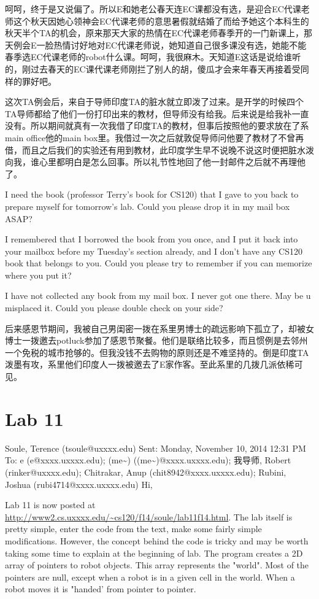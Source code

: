 \documentclass[12pt]{book}
\begin{document}
呵呵，终于是又说偏了。所以E和她老公春天连EC课都没有选，是迎合EC代课老师这个秋天因她心领神会EC代课老师的意思暑假就结婚了而给予她这个本科生的秋天半个TA的机会，原来那天大家的热情在EC代课老师春季开的一门新课上，那天例会E一脸热情讨好地对EC代课老师说，她知道自己很多课没有选，她能不能春季选EC代课老师的robot什么课。呵呵，我很麻木。天知道E这话是说给谁听的，刚过去春天的EC课代课老师刚拦了别人的胡，傻瓜才会来年春天再接着受同样的罪好吧。

这次TA例会后，来自于导师印度TA的脏水就立即泼了过来。是开学的时候四个TA导师都给了他们一份打印出来的教材，但导师没有给我。后来说是给我补一直没有。所以期间就真有一次我借了印度TA的教材，但事后按照他的要求放在了系main office他的main box里。我借过一次之后就敦促导师问他要了教材了不曾再借，而且之后我们的实验还有用到教材，此印度学生早不说晚不说这时便把脏水泼向我，谁心里都明白是怎么回事。所以礼节性地回了他一封邮件之后就不再理他了。

I need the book (professor Terry's book for CS120) that I gave to you back to prepare myself for tomorrow's lab. Could you please drop it in my mail box ASAP?

I remembered that I borrowed the book from you once, and I put it back into your mailbox before my Tuesday's section already, and I don't have any CS120 book that belongs to you. Could you please try to remember if you can memorize where you put it?

I have not collected any book from my mail box. I never got one there. May be u misplaced it. Could you please double check on your side?

后来感恩节期间，我被自己男闺密一拨在系里男博士的疏远影响下孤立了，却被女博士一拨邀去potluck参加了感恩节聚餐。他们是联络比较多，而且惯例是去邻州一个免税的城市抢够的。但我没钱不去购物的原则还是不难坚持的。倒是印度TA泼墨有攻，系里他们印度人一拨被邀去了E家作客。至此系里的几拨几派依稀可见。 

\section{Lab 11}
\label{sec-25-1}
Soule, Terence (tsoule@uxxxx.edu)
Sent:        Monday, November 10, 2014 12:31 PM
To:        
e (e@xxxx.uxxxx.edu); (me\textasciitilde{}) ((me\textasciitilde{})@xxxx.uxxxx.edu); 我导师, Robert (rinker@uxxxx.edu); Chitrakar, Anup (chit8942@xxxx.uxxxx.edu); Rubini, Joshua (rubi4714@xxxx.uxxxx.edu)
Hi,

Lab 11 is now posted at \url{http://www2.cs.uxxxx.edu/~cs120/f14/soule/lab11f14.html}.
The lab itself is pretty simple, enter the code from the text, make some fairly simple modifications.
However, the concept behind the code is tricky and may be worth taking some time to explain at the beginning of lab.  The program creates a 2D array of pointers to robot objects.  This array represents the "world".  Most of the pointers are null, except when a robot is in a given cell in the world.  When a robot moves it is "handed' from pointer to pointer.
\end{document}
